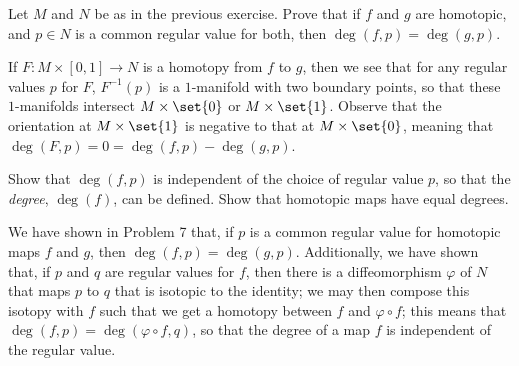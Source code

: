 \documentclass[10pt]{mypackage}
\begin{document}
\begin{problem}[Problem 7]
  Let $M$ and $N$ be as in the previous exercise. Prove that if $f$ and $g$ are homotopic, and $p\in N$ is a common regular value for both, then $ \operatorname{deg}\left( f,p \right) = \operatorname{deg}\left( g,p \right) $.
\end{problem}
\begin{solution}
  If $F\colon M\times [0,1]\rightarrow N$ is a homotopy from $f$ to $g$, then we see that for any regular values $p$ for $F$, $F^{-1}\left( p \right)$ is a $1$-manifold with two boundary points, so that these $1$-manifolds intersect $M\times \set{0}$ or $M\times \set{1}$. Observe that the orientation at $M\times \set{1}$ is negative to that at $M\times \set{0}$, meaning that $ \operatorname{deg}\left( F,p \right) = 0 = \operatorname{deg}\left( f,p \right) - \operatorname{deg}\left( g,p \right)$.
\end{solution}
\begin{problem}[Problem 8]
  Show that $ \operatorname{deg}\left( f,p \right) $ is independent of the choice of regular value $p$, so that the \textit{degree}, $\operatorname{deg}\left( f \right)$, can be defined. Show that homotopic maps have equal degrees.
\end{problem}
\begin{solution}
  We have shown in Problem 7 that, if $p$ is a common regular value for homotopic maps $f$ and $g$, then $ \operatorname{deg}\left( f,p \right) = \operatorname{deg}\left( g,p \right) $. Additionally, we have shown that, if $p$ and $q$ are regular values for $f$, then there is a diffeomorphism $\varphi$ of $N$ that maps $p$ to $q$ that is isotopic to the identity; we may then compose this isotopy with $f$ such that we get a homotopy between $f$ and $\varphi\circ f$; this means that $ \operatorname{deg}\left( f,p \right) = \operatorname{deg}\left( \varphi\circ f,q \right) $, so that the degree of a map $f$ is independent of the regular value.
\end{solution}
\end{document}
